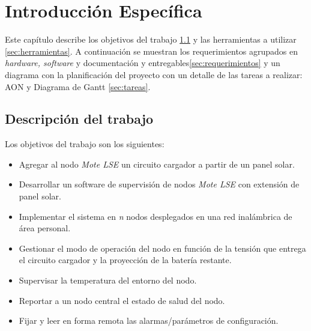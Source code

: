 \chapter{Introducción Específica} %

\label{Chapter2}

Este capítulo describe los objetivos del trabajo \ref{sec:trabajo} y las herramientas a utilizar \ref{sec:herramientas}. A continuación se muestran los requerimientos agrupados en \textit{hardware, software} y documentación y entregables\ref{sec:requerimientos} y un diagrama con la planificación del proyecto con un detalle de las tareas a realizar: AON y Diagrama de Gantt \ref{sec:tareas}.

\section{Descripción del trabajo}
\label{sec:trabajo}
\noindent Los objetivos del trabajo son los siguientes:

\begin{itemize}
	\item Agregar al nodo \textit{Mote LSE} un circuito cargador a partir de un panel solar.
	\item Desarrollar un software de supervisión de nodos \textit{Mote LSE} con extensión de panel solar.
	\item Implementar el sistema en \textit{n} nodos desplegados en una red inalámbrica de área personal.
	\item Gestionar el modo de operación del nodo en función de la tensión que entrega el circuito cargador y la proyección de la batería restante.
	\item Supervisar la temperatura del entorno del nodo.
	\item Reportar a un nodo central el estado de salud del nodo.
	\item Fijar y leer en forma remota las alarmas/parámetros de configuración.
	\end{itemize}

